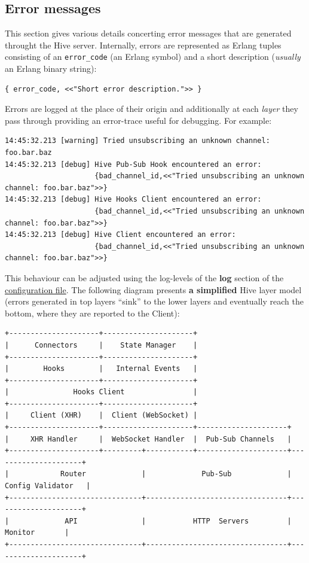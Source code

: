 \documentclass[a4paper]{article}
\begin{document}
\subsection{Error messages}
\label{sec-5-2}

This section gives various details concerting error messages that are generated throught the Hive server. Internally, errors are represented as Erlang tuples consisting of an \texttt{error\_code} (an Erlang symbol) and a short description (\emph{usually} an Erlang binary string):


\begin{verbatim}
{ error_code, <<"Short error description.">> }
\end{verbatim}




\noindent
Errors are logged at the place of their origin and additionally at each \emph{layer} they pass through providing an error-trace useful for debugging. For example:


\begin{verbatim}
14:45:32.213 [warning] Tried unsubscribing an unknown channel: foo.bar.baz
14:45:32.213 [debug] Hive Pub-Sub Hook encountered an error:
                     {bad_channel_id,<<"Tried unsubscribing an unknown channel: foo.bar.baz">>}
14:45:32.213 [debug] Hive Hooks Client encountered an error:
                     {bad_channel_id,<<"Tried unsubscribing an unknown channel: foo.bar.baz">>}
14:45:32.213 [debug] Hive Client encountered an error:
                     {bad_channel_id,<<"Tried unsubscribing an unknown channel: foo.bar.baz">>}
\end{verbatim}



\noindent
This behaviour can be adjusted using the log-levels of the \textbf{log} section of the \hyperref[sec-3-1-8]{configuration file}. The following diagram presents \textbf{a simplified} Hive layer model (errors generated in top layers ``sink'' to the lower layers and eventually reach the bottom, where they are reported to the Client):


\begin{verbatim}
+---------------------+---------------------+
|      Connectors     |    State Manager    |
+---------------------+---------------------+
|        Hooks        |   Internal Events   |
+---------------------+---------------------+
|               Hooks Client                |
+---------------------+---------------------+
|     Client (XHR)    |  Client (WebSocket) |
+---------------------+---------------------+---------------------+
|     XHR Handler     |  WebSocket Handler  |  Pub-Sub Channels   |
+---------------------+---------+-----------+---------------------+---------------------+
|            Router             |             Pub-Sub             |  Config Validator   |
+-------------------------------+---------------------------------+---------------------+
|             API               |           HTTP  Servers         |       Monitor       |
+-------------------------------+---------------------------------+---------------------+
\end{verbatim}
\end{document}
